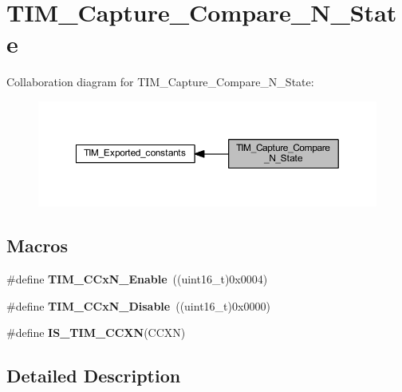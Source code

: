 \hypertarget{group___t_i_m___capture___compare___n___state}{}\section{T\+I\+M\+\_\+\+Capture\+\_\+\+Compare\+\_\+\+N\+\_\+\+State}
\label{group___t_i_m___capture___compare___n___state}
Collaboration diagram for T\+I\+M\+\_\+\+Capture\+\_\+\+Compare\+\_\+\+N\+\_\+\+State\+:
\nopagebreak
\begin{figure}[H]
\begin{center}
\leavevmode
\includegraphics[width=350pt]{group___t_i_m___capture___compare___n___state}
\end{center}
\end{figure}
\subsection*{Macros}
\begin{DoxyCompactItemize}
\item 
\mbox{\label{group___t_i_m___capture___compare___n___state_gab534ddf23d317eb912564292c1cede2d}} 
\#define {\bfseries T\+I\+M\+\_\+\+C\+Cx\+N\+\_\+\+Enable}~((uint16\+\_\+t)0x0004)
\item 
\mbox{\label{group___t_i_m___capture___compare___n___state_ga0d7d46aeba33ed197aa39775bc527d7d}} 
\#define {\bfseries T\+I\+M\+\_\+\+C\+Cx\+N\+\_\+\+Disable}~((uint16\+\_\+t)0x0000)
\item 
\#define {\bfseries I\+S\+\_\+\+T\+I\+M\+\_\+\+C\+C\+XN}(C\+C\+XN)
\end{DoxyCompactItemize}


\subsection{Detailed Description}


